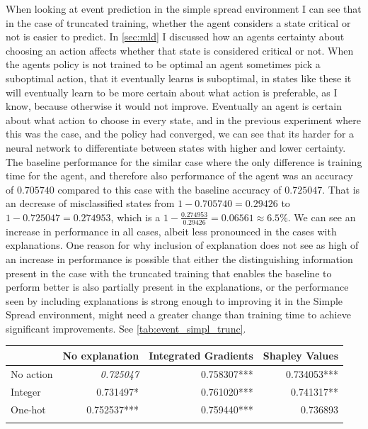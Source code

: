 \documentclass[UKenglish]{uiomasterthesis}
\begin{document}
When looking at event prediction in the simple spread environment I can see that in the case of truncated training, whether the agent considers a state critical or not is easier to predict. In \cref{sec:mld} I discussed how an agents certainty about choosing an action affects whether that state is considered critical or not. When the agents policy is not trained to be optimal an agent sometimes pick a suboptimal action, that it eventually learns is suboptimal, in states like these it will eventually learn to be more certain about what action is preferable, as I know, because otherwise it would not improve. Eventually an agent is certain about what action to choose in every state, and in the previous experiment where this was the case, and the policy had converged, we can see that its harder for a neural network to differentiate between states with higher and lower certainty. The baseline performance for the similar case where the only difference is training time for the agent, and therefore also performance of the agent was an accuracy of $0.705740$ compared to this case with the baseline accuracy of $0.725047$. That is an decrease of misclassified states from $1-0.705740 = 0.29426$ to $1-0.725047 = 0.274953$, which is a $1-\frac{0.274953}{0.29426}=0.06561\approx 6.5\%$. We can see an increase in performance in all cases, albeit less pronounced in the cases with explanations. One reason for why inclusion of explanation does not see as high of an increase in performance is possible that either the distinguishing information present in the case with the truncated training that enables the baseline to perform better is also partially present in the explanations, or the performance seen by including explanations is strong enough to improving it in the Simple Spread environment, might need a greater change than training time to achieve significant improvements. See \cref{tab:event_simpl_trunc}.

\begin{center}
\label{tab:event_simpl_trunc}
\begin{tabular}{lrrr}
\toprule
 & No explanation & Integrated Gradients & Shapley Values \\
 \midrule
No action & \textit{0.725047} & 0.758307*** & 0.734053*** \\
Integer & 0.731497* & 0.761020*** & 0.741317** \\
One-hot & 0.752537*** & 0.759440*** & 0.736893 \\
\bottomrule
\addlinespace[2pt]
\multicolumn{3}{l}{\textsuperscript{***}$p<0.001$, 
  \textsuperscript{**}$p<0.01$, 
  \textsuperscript{*}$p<0.05$}
\end{tabular}
\end{center}
\end{document}
